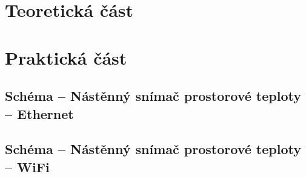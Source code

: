 \documentclass[twoside]{ctuthesis}
\theoremstyle{plain}
\theoremstyle{definition}
\theoremstyle{note}
\begin{document}
\maketitle

\printglossaries




\part{Teoretická část}




%

\part{Praktická část}









\appendix


\chapter{Schéma – Nástěnný snímač prostorové teploty – Ethernet}
\label{app:nastenny-snimac-prostorove-teploty-ethernet}





\chapter{Schéma – Nástěnný snímač prostorové teploty – WiFi}
\label{app:nastenny-snimac-prostorove-teploty-wifi}


\end{document}
